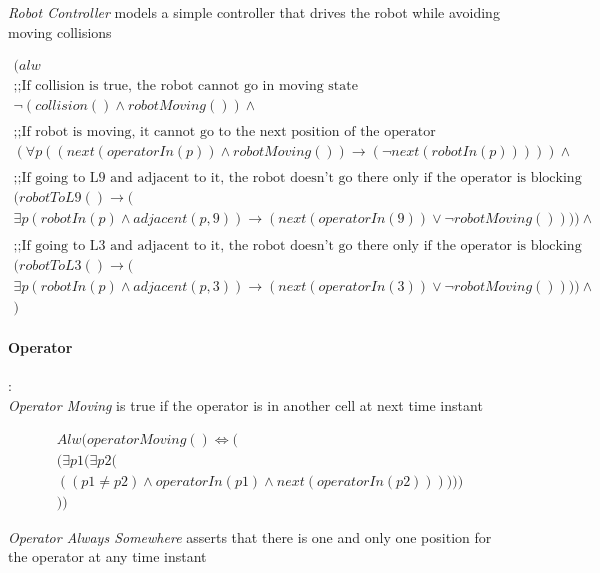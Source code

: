 \textit{Robot Controller} models a simple controller that drives the robot while avoiding moving collisions

\begin{align*}
	(alw\\
	\text{;;If collision is true, the robot cannot go in moving state}\\
	\neg(collision()\land robotMoving())\land \\
	\\
	\text{;;If robot is moving, it cannot go to the next position of the operator}\\
	(\forall p((next(operatorIn(p))\land robotMoving())\longrightarrow(\neg next(robotIn(p)))))\land\\
	\\
	\text{;;If going to L9 and adjacent to it, the robot doesn't go there only if the operator is blocking}\\
	(robotToL9()\longrightarrow(\\
	\exists p(robotIn(p)\land adjacent(p,9))\longrightarrow(next(operatorIn(9))\lor \neg robotMoving())))\land\\
	\\
	\text{;;If going to L3 and adjacent to it, the robot doesn't go there only if the operator is blocking}\\
	(robotToL3()\longrightarrow(\\
	\exists p(robotIn(p)\land adjacent(p,3))\longrightarrow(next(operatorIn(3))\lor \neg robotMoving())))\land\\
	)
\end{align*}


\paragraph{Operator}:\\

\textit{Operator Moving} is true if the operator is in another cell at next time instant

\begin{align*}
	Alw(operatorMoving()\iff (\\
	(\exists p1(\exists p2 (\\
	((p1\neq p2)\land operatorIn(p1) \land next(operatorIn(p2))) )))\\
	))
\end{align*}

\textit{Operator Always Somewhere} asserts that there is one and only one position for the operator at any time instant

